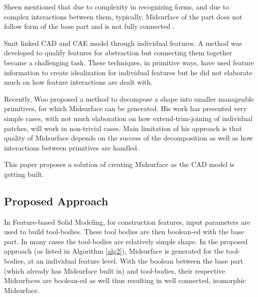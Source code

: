 Sheen  \citep{Sheen2008} mentioned that due to complexity in recognizing forms, and due to complex interactions between them, typically, Midsurface of the part does not follow form of the base part and is not fully connected . 

Smit \citep{Smit2011} linked CAD and CAE model through individual features. A method was developed to qualify features for abstraction but connecting them together became a challenging task. These techniques, in primitive ways, have used feature information to create idealization for individual features but he did not elaborate much on how feature interactions are dealt with.

Recently, Woo \citep{Woo2013} proposed a method to decompose a  shape into smaller manageable primitives, for which Midsurface can be generated. His work has presented very simple cases, with not much elaboration on how extend-trim-joining of individual patches, will work in non-trivial cases. Main limitation of his approach is that quality of Midsurface depends on the success of the decomposition as well as how interactions between primitives are handled.

This paper proposes a solution of creating Midsurface as the CAD model is getting built.



\subsection{Proposed Approach}

In Feature-based Solid Modeling, for construction features,  input parameters are used to build tool-bodies. These tool bodies are then boolean-ed with the base part. In many cases the tool-bodies are relatively simple shape. In the proposed approach  (as listed in Algorithm \ref{alg2}), Midsurface is generated for the tool-bodies, at an individual feature level. With the boolean between the base part (which already has Midsurface built in) and tool-bodies, their respective Midsurfaces are boolean-ed as well thus resulting in well connected, isomorphic Midsurface. 

